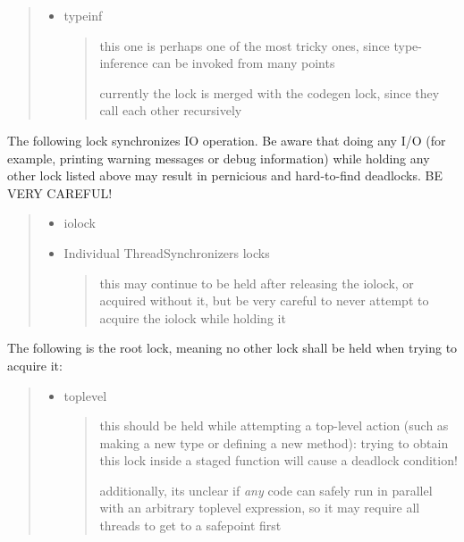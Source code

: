 \begin{quote}
\begin{itemize}
\item typeinf

\begin{quote}
this one is perhaps one of the most tricky ones, since type-inference can be invoked from many points

currently the lock is merged with the codegen lock, since they call each other recursively

\end{quote}
\end{itemize}
\end{quote}


The following lock synchronizes IO operation. Be aware that doing any I/O (for example, printing warning messages or debug information) while holding any other lock listed above may result in pernicious and hard-to-find deadlocks. BE VERY CAREFUL!



\begin{quote}
\begin{itemize}
\item iolock


\item Individual ThreadSynchronizers locks

\begin{quote}
this may continue to be held after releasing the iolock, or acquired without it, but be very careful to never attempt to acquire the iolock while holding it

\end{quote}
\end{itemize}
\end{quote}


The following is the root lock, meaning no other lock shall be held when trying to acquire it:



\begin{quote}
\begin{itemize}
\item toplevel

\begin{quote}
this should be held while attempting a top-level action (such as making a new type or defining a new method): trying to obtain this lock inside a staged function will cause a deadlock condition!

additionally, it{\textquotesingle}s unclear if \emph{any} code can safely run in parallel with an arbitrary toplevel expression, so it may require all threads to get to a safepoint first

\end{quote}
\end{itemize}
\end{quote}


